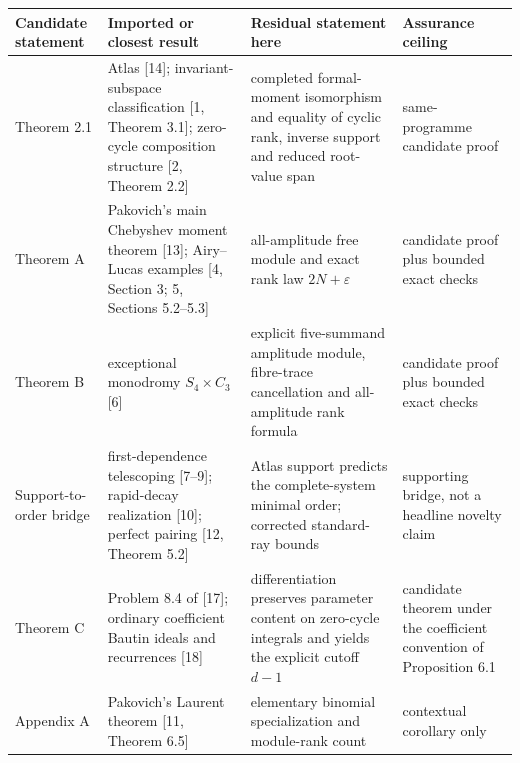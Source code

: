 \documentclass[
  11pt,
  a4paper,
]{amsart}
\newcounter{none} %
\begin{document}
{\def\LTcaptype{none} %
\begin{longtable}[]{@{}
  >{\raggedright\arraybackslash}p{}
  >{\raggedright\arraybackslash}p{}
  >{\raggedright\arraybackslash}p{}
  >{\raggedright\arraybackslash}p{}@{}}
\toprule\noalign{}
\begin{minipage}[b]{\linewidth}\raggedright
Candidate statement
\end{minipage} & \begin{minipage}[b]{\linewidth}\raggedright
Imported or closest result
\end{minipage} & \begin{minipage}[b]{\linewidth}\raggedright
Residual statement here
\end{minipage} & \begin{minipage}[b]{\linewidth}\raggedright
Assurance ceiling
\end{minipage} \\
\midrule\noalign{}
\endhead
\bottomrule\noalign{}
\endlastfoot
Theorem 2.1 & Atlas {[}14{]}; invariant-subspace classification {[}1,
Theorem 3.1{]}; zero-cycle composition structure {[}2, Theorem 2.2{]} &
completed formal-moment isomorphism and equality of cyclic rank, inverse
support and reduced root-value span & same-programme candidate proof \\
Theorem A & Pakovich's main Chebyshev moment theorem {[}13{]};
Airy--Lucas examples {[}4, Section 3; 5, Sections 5.2--5.3{]} &
all-amplitude free module and exact rank law \(2N+\varepsilon\) &
candidate proof plus bounded exact checks \\
Theorem B & exceptional monodromy \(S_4\times C_3\) {[}6{]} & explicit
five-summand amplitude module, fibre-trace cancellation and
all-amplitude rank formula & candidate proof plus bounded exact
checks \\
Support-to-order bridge & first-dependence telescoping {[}7--9{]};
rapid-decay realization {[}10{]}; perfect pairing {[}12, Theorem 5.2{]}
& Atlas support predicts the complete-system minimal order; corrected
standard-ray bounds & supporting bridge, not a headline novelty claim \\
Theorem C & Problem 8.4 of {[}17{]}; ordinary coefficient Bautin ideals
and recurrences {[}18{]} & differentiation preserves parameter content
on zero-cycle integrals and yields the explicit cutoff \(d-1\) &
candidate theorem under the coefficient convention of Proposition 6.1 \\
Appendix A & Pakovich's Laurent theorem {[}11, Theorem 6.5{]} &
elementary binomial specialization and module-rank count & contextual
corollary only \\
\end{longtable}
}
\end{document}

